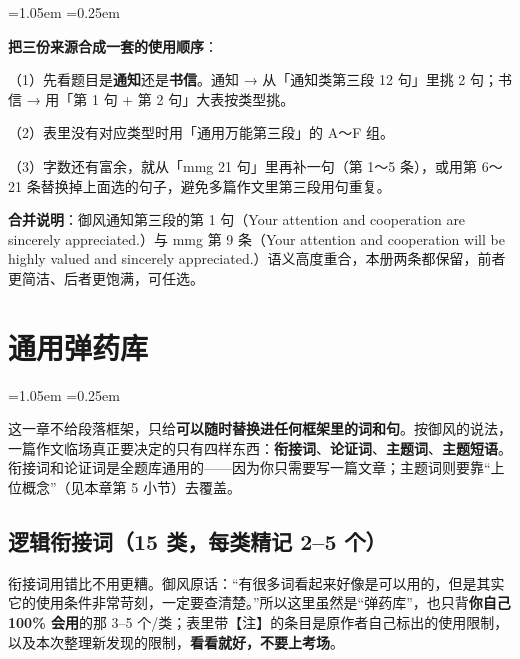 \documentclass[11pt,a4paper]{ctexart}
\newcommand{\kw}[1]{{\bfseries\color{accent}#1}}
\newcommand{\zone}[1]{\par\addvspace{3pt}\noindent{\bfseries\color{accent}【雷区】}#1\par\addvspace{3pt}}
\newenvironment{note}{%
  \par\addvspace{5pt}%
  \begin{list}{}{\leftmargin=1.05em \rightmargin=0.25em \listparindent=0pt
    \itemindent=0pt \topsep=0pt \parsep=2pt \itemsep=2pt \partopsep=0pt}%
  \item\relax\small\color{ink}%
}{%
  \end{list}\addvspace{5pt}%
}
\begin{document}
\begin{note}
\textbf{把三份来源合成一套的使用顺序}：

（1）先看题目是\textbf{通知}还是\textbf{书信}。通知 → 从「通知类第三段 12 句」里挑 2 句；书信 → 用「第 1 句 + 第 2 句」大表按类型挑。

（2）表里没有对应类型时用「通用万能第三段」的 A～F 组。

（3）字数还有富余，就从「mmg 21 句」里再补一句（第 1～5 条），或用第 6～21 条替换掉上面选的句子，避免多篇作文里第三段用句重复。

\textbf{合并说明}：御风通知第三段的第 1 句（Your attention and cooperation are sincerely appreciated.）与 mmg 第 9 条（Your attention and cooperation will be highly valued and sincerely appreciated.）语义高度重合，本册两条都保留，前者更简洁、后者更饱满，可任选。
\end{note}


\section{通用弹药库}

\begin{note}
这一章不给段落框架，只给\textbf{可以随时替换进任何框架里的词和句}。按御风的说法，一篇作文临场真正要决定的只有四样东西：\kw{衔接词}、\kw{论证词}、\kw{主题词}、\kw{主题短语}。衔接词和论证词是全题库通用的——因为你只需要写一篇文章；主题词则要靠“上位概念”（见本章第 5 小节）去覆盖。
\end{note}

\subsection{逻辑衔接词（15 类，每类精记 2--5 个）}

\zone{衔接词用错比不用更糟。御风原话：“有很多词看起来好像是可以用的，但是其实它的使用条件非常苛刻，一定要查清楚。”所以这里虽然是“弹药库”，也只背\textbf{你自己 100\% 会用}的那 3--5 个/类；表里带【注】的条目是原作者自己标出的使用限制，以及本次整理新发现的限制，\textbf{看看就好，不要上考场}。}
\end{document}
